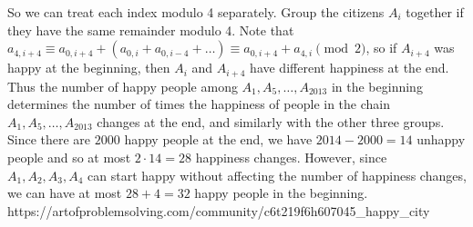 {    So we can treat each index modulo 4 separately. Group the citizens $A_i$ together if they have the same remainder modulo 4. Note that $a_{4,i+4} \equiv a_{0,i+4} + (a_{0,i} + a_{0,i-4} + \ldots) \equiv a_{0,i+4} + a_{4,i} \pmod 2$, so if $A_{i+4}$ was happy at the beginning, then $A_i$ and $A_{i+4}$ have different happiness at the end. Thus the number of happy people among $A_1, A_5, \ldots, A_{2013}$ in the beginning determines the number of times the happiness of people in the chain $A_1, A_5, \ldots, A_{2013}$ changes at the end, and similarly with the other three groups. Since there are $2000$ happy people at the end, we have $2014-2000 = 14$ unhappy people and so at most $2 \cdot 14 = 28$ happiness changes. However, since $A_1, A_2, A_3, A_4$ can start happy without affecting the number of happiness changes, we can have at most $28+4 = \boxed{32}$ happy people in the beginning.
    }{%
    https://artofproblemsolving.com/community/c6t219f6h607045_happy_city
}
